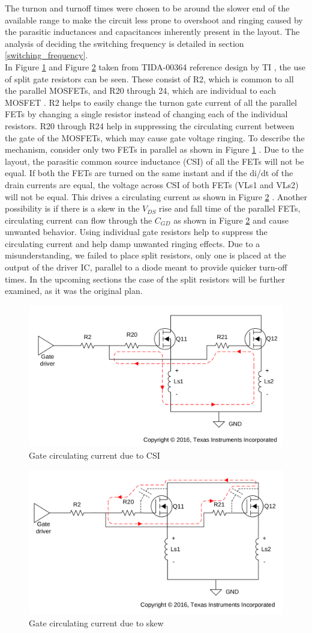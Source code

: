 The turnon and turnoff times were chosen to be around the slower end of the available range to make the circuit less prone to overshoot and ringing caused by the parasitic inductances and capacitances inherently present in the layout. The analysis of deciding the switching frequency is detailed in section \ref{switching_frequency}. \\

In Figure \ref{fig:CSI_current} and Figure \ref{fig:skew_current} taken from TIDA-00364 reference design by TI , the use of split gate resistors can be seen. These consist of R2, which is common to all the parallel MOSFETs, and R20 through 24, which are individual to each MOSFET . R2 helps to easily change the turnon gate current of all the parallel FETs by changing a single resistor instead of changing each of the individual resistors. R20 through R24 help in suppressing the circulating current between the gate of the MOSFETs, which may cause gate voltage ringing. To describe the mechanism, consider only two FETs in parallel as shown in Figure \ref{fig:CSI_current} . Due to the layout, the parasitic common source inductance (CSI) of all the FETs will not be equal. If both the FETs are turned on the same instant and if the di/dt of the drain currents are equal, the voltage across CSI of both FETs (VLs1 and VLs2) will not be equal. This drives a circulating current as shown in Figure \ref{fig:skew_current} . Another possibility is if there is a skew in the $V_{DS}$ rise and fall time of the parallel FETs, circulating current can flow through the $C_{GD}$ as shown in Figure \ref{fig:skew_current} and cause unwanted behavior. Using individual gate resistors help to suppress the circulating current and help damp unwanted ringing effects. Due to a misunderstanding, we failed to place split resistors, only one is placed at the output of the driver IC, parallel to a diode meant to provide quicker turn-off times. In the upcoming sections the case of the split resistors will be further examined, as it was the original plan.

\begin{figure}[H]
	\centering
	\includegraphics[width=0.6\linewidth]{pictures/hardware/Driver_Board/CSI.png}
	\caption{Gate circulating current due to CSI}
	\label{fig:CSI_current}
\end{figure}

\begin{figure}[H]
	\centering
	\includegraphics[width=0.6\linewidth]{pictures/hardware/Driver_Board/skew.png}
	\caption{Gate circulating current due to skew}
	\label{fig:skew_current}
\end{figure}
